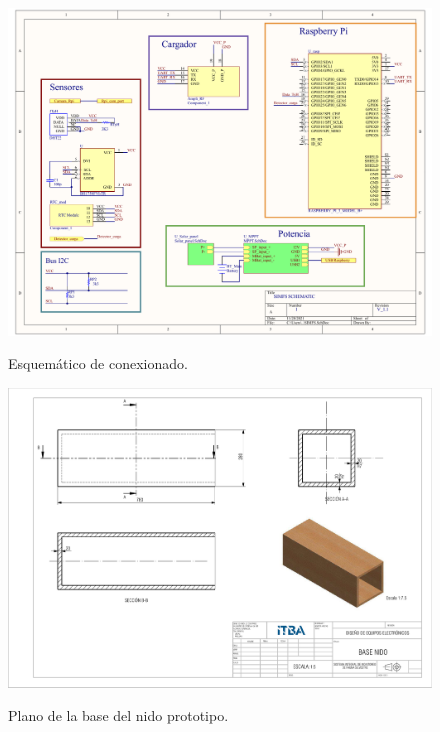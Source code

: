 
\begin{figure}[H]
	\centering
	\includegraphics[width=\linewidth]{ImagenesApendice/esquematico}
	\label{fig:esquematico_conexionado}
	\caption{Esquem\'atico de conexionado.}
\end{figure}

\begin{figure}[H]
	\centering
	\includegraphics[width=\linewidth]{ImagenesApendice/Base_nido_plano}
	\label{fig:Base_nido_plano}
	\caption{Plano de la base del nido prototipo.}
\end{figure}

